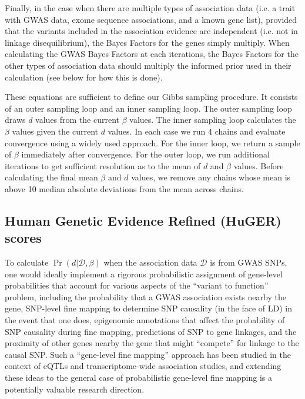 Finally, in the case when there are multiple types of association data
(i.e. a trait with GWAS data, exome sequence associations, and a known
gene list), provided that the variants included in the association
evidence are independent (i.e. not in linkage disequilibrium), the
Bayes Factors for the genes simply multiply. When calculating the GWAS
Bayes Factors at each iterations, the Bayes Factors for the other
types of association data should multiply the informed prior used in
their calculation (see below for how this is done).

These equations are sufficient to define our Gibbs sampling
procedure. It consists of an outer sampling loop and an inner sampling
loop. The outer sampling loop draws $d$ values from the current
$\beta$ values. The inner sampling loop calculates the $\beta$ values
given the current $d$ values. In each case we run 4 chains and evaluate
convergence using a widely used approach\cite{}. For the inner loop,
we return a sample of $\beta$ immediately after convergence. For the
outer loop, we run additional iterations to get sufficient resolution
as to the mean of $d$ and $\beta$ values. Before calculating the final mean $\beta$ and $d$ values, we
remove any chains whose mean is above 10 median absolute deviations
from the mean across chains.

\subsection{Human Genetic Evidence Refined (HuGER) scores}

To calculate $\Pr\left(d|\mathcal{D},\beta\right)$
when the association data $\mathcal{D}$ is from GWAS SNPs, one would
ideally implement a rigorous probabilistic assignment of gene-level
probabilities that account for various aspects of the ``variant to
function''\cite{} problem, including the probability that a GWAS
association exists nearby the gene, SNP-level fine mapping to
determine SNP causality (in the face of LD) in the event that one
does, epigenomic annotations that affect the probability of SNP
causality during fine mapping, predictions of SNP to gene linkages,
and the proximity of other genes nearby the gene that might
``compete'' for linkage to the causal SNP. Such a ``gene-level fine
mapping'' approach has been studied in the context of eQTLs\cite{} and
transcriptome-wide association studies\cite{}, and extending these
ideas to the general case of probabilistic gene-level fine mapping
is a potentially valuable research direction. 

